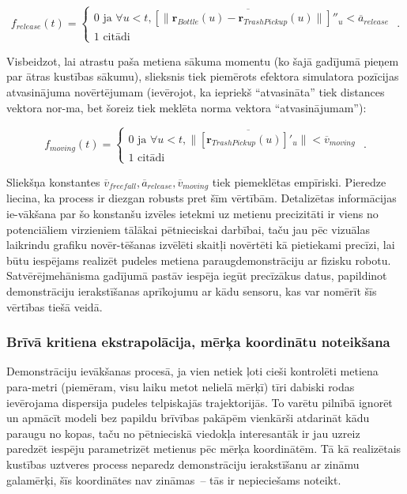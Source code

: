 \documentclass[12pt, a4paper]{article}
\numberwithin{equation}{section} %
\begin{document}
\begin{equation}
    f_{release} (t) = \begin{cases}
        0 \text{ ja } \forall u < t, \overline{ \left [ \lVert  \boldsymbol{r}_{Bottle}(u) -  \boldsymbol{r}_{TrashPickup}(u)  \rVert \right ] ''_u} < \overline{a}_{release} \\
        1 \text{ citādi }
    \end{cases}
\text{ .}
\end{equation}

Visbeidzot, lai atrastu paša metiena sākuma momentu (ko šajā gadījumā pieņem par ātras kustības sākumu), slieksnis tiek piemērots efektora simulatora pozīcijas atvasinājuma novērtējumam (ievērojot, ka iepriekš ``atvasināta'' tiek distances vektora nor-ma, bet šoreiz tiek meklēta norma vektora ``atvasinājumam''):

\begin{equation}
    f_{moving} (t) = \begin{cases}
        0 \text{ ja } \forall u < t,  \lVert \overline{\left [  \boldsymbol{r}_{TrashPickup}(u) \right ]'_u} \rVert  < \overline{v}_{moving} \\
        1 \text{ citādi }
    \end{cases}
\text{ .}
\end{equation}

Sliekšņa konstantes $\overline{v}_{freefall}, \overline{a}_{release}, \overline{v}_{moving}$ tiek piemeklētas empīriski. Pieredze liecina, ka process ir diezgan robusts pret šīm vērtībām. Detalizētas informācijas ie-vākšana par šo konstanšu izvēles ietekmi uz metienu precizitāti ir viens no potenciāliem virzieniem tālākai pētnieciskai darbībai, taču jau pēc vizuālas laikrindu grafiku novēr-tēšanas izvēlēti skaitļi novērtēti kā pietiekami precīzi, lai būtu iespējams realizēt pudeles metiena paraugdemonstrāciju ar fizisku robotu. Satvērējmehānisma gadījumā pastāv iespēja iegūt precīzākus datus, papildinot demonstrāciju ierakstīšanas aprīkojumu ar kādu sensoru, kas var nomērīt šīs vērtības tiešā veidā.

\subsubsection{Brīvā kritiena ekstrapolācija, mērķa koordinātu noteikšana}

Demonstrāciju ievākšanas procesā, ja vien netiek ļoti cieši kontrolēti metiena para-metri (piemēram, visu laiku metot nelielā mērķī) tīri dabiski rodas ievērojama dispersija pudeles telpiskajās trajektorijās. To varētu pilnībā ignorēt un apmācīt modeli bez papildu brīvības pakāpēm vienkārši atdarināt kādu paraugu no kopas, taču no pētnieciskā viedokļa interesantāk ir jau uzreiz paredzēt iespēju parametrizēt metienus pēc mērķa koordinātēm. Tā kā realizētais kustības uztveres process neparedz demonstrāciju ierakstīšanu ar zināmu galamērķi, šīs koordinātes nav zināmas~-- tās ir nepieciešams noteikt.
\end{document}

